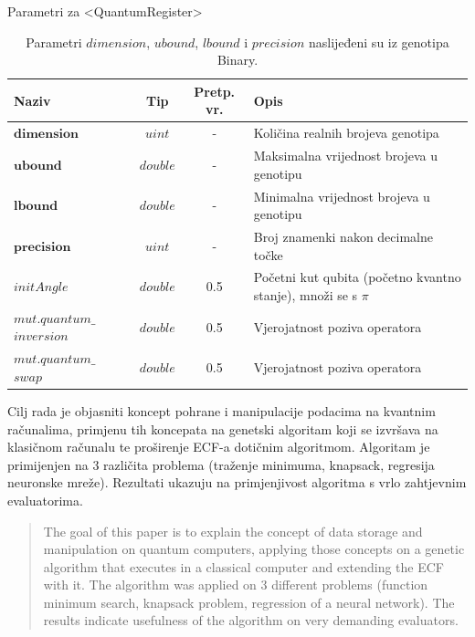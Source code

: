 \documentclass[times, utf8, zavrsni, numeric]{fer}
\begin{document}
\begin{table}[htb]
\caption{Parametri za <QuantumRegister>}
\label{tbl:param_kvareg}
\centering
\caption*{\footnotesize Parametri $dimension$, $ubound$, $lbound$ i $precision$ naslijeđeni su iz genotipa Binary.}
\begin{tabular}{p{3cm}ccp{7cm}} \hline
Naziv & Tip & Pretp. vr. & Opis\\ \toprule
$\textbf{dimension}$ & $uint$ & - & Količina realnih brojeva genotipa \\
$\textbf{ubound}$ & $double$ & - & Maksimalna vrijednost brojeva u genotipu \\
$\textbf{lbound}$ & $double$ & - & Minimalna vrijednost brojeva u genotipu \\
$\textbf{precision}$ & $uint$ & - & Broj znamenki nakon decimalne točke \\
$initAngle$ & $double$ & 0.5 & Početni kut qubita (početno kvantno stanje), množi se s $\pi$ \\
$mut.quantum\_$ $inversion$ & $double$ & 0.5 & Vjerojatnost poziva operatora \\
$mut.quantum\_$ $swap$ & $double$ & 0.5 & Vjerojatnost poziva operatora \\ \bottomrule
\end{tabular}
\end{table}

\clearpage

\begin{sazetak}
Cilj rada je objasniti koncept pohrane i manipulacije podacima na kvantnim računalima, primjenu tih koncepata na genetski algoritam koji se izvršava na klasičnom računalu te proširenje ECF-a dotičnim algoritmom. Algoritam je primijenjen na 3 različita problema (traženje minimuma, knapsack, regresija neuronske mreže). Rezultati ukazuju na primjenjivost algoritma s vrlo zahtjevnim evaluatorima.

\end{sazetak}

\begin{abstract}
The goal of this paper is to explain the concept of data storage and manipulation on quantum computers, applying those concepts on a genetic algorithm that executes in a classical computer and extending the ECF with it. The algorithm was applied on 3 different problems (function minimum search, knapsack problem, regression of a neural network). The results indicate usefulness of the algorithm on very demanding evaluators.

\end{abstract}
\end{document}

